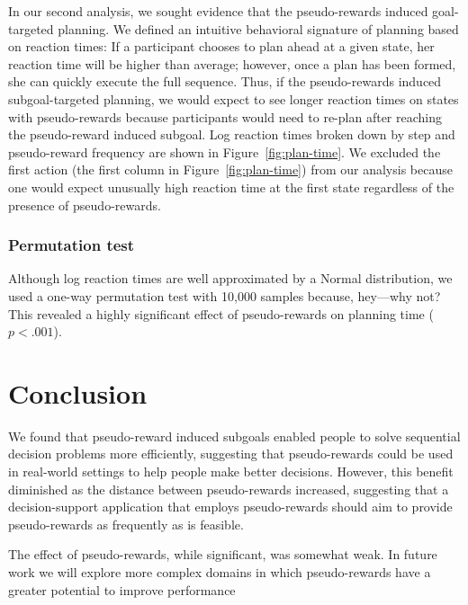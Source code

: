 \documentclass[10pt,letterpaper]{article}
\begin{document}
In our second analysis, we sought evidence that the pseudo-rewards induced goal-targeted planning. We defined an intuitive behavioral signature of planning based on reaction times: If a participant chooses to plan ahead at a given state, her reaction time will be higher than average; however, once a plan has been formed, she can quickly execute the full sequence. Thus, if the pseudo-rewards induced subgoal-targeted planning, we would expect to see longer reaction times on states with pseudo-rewards because participants would need to re-plan after reaching the pseudo-reward induced subgoal. Log reaction times broken down by step and pseudo-reward frequency are shown in Figure~\ref{fig:plan-time}. We excluded the first action (the first column in Figure~\ref{fig:plan-time}) from our analysis because one would expect unusually high reaction time at the first state regardless of the presence of pseudo-rewards.


\subsubsection{Permutation test}

Although log reaction times are well approximated by a Normal distribution, we used a one-way permutation test with 10,000 samples because, hey—why not? This revealed a highly significant effect of pseudo-rewards on planning time ($p < .001$).


\section{Conclusion}\label{discussion}

We found that pseudo-reward induced subgoals enabled people to solve sequential decision problems more efficiently, suggesting that pseudo-rewards could be used in real-world settings to help people make better decisions. However, this benefit diminished as the distance between pseudo-rewards increased, suggesting that a decision-support application that employs pseudo-rewards should aim to provide pseudo-rewards as frequently as is feasible.

The effect of pseudo-rewards, while significant, was somewhat weak. In future work we will explore more complex domains in which pseudo-rewards have a greater potential to improve performance


%

\renewcommand{\bibliographytypesize}{\small}
% 

\end{document}
